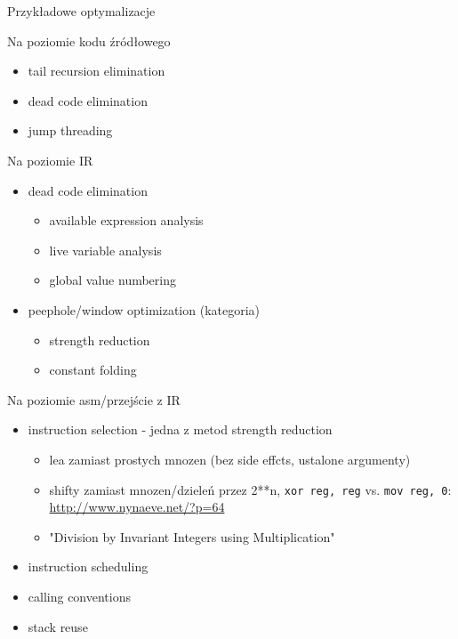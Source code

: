 \begin{frame}{Przykładowe optymalizacje}
\begin{block}{Na poziomie kodu źródłowego}
\begin{itemize}
			\item tail recursion elimination
			\item dead code elimination
			\item jump threading
		\end{itemize}
	\end{block}
	\begin{block}{Na poziomie IR}
		\begin{itemize}
			\item dead code elimination
				\begin{itemize}
					\item available expression analysis
					\item live variable analysis
					\item global value numbering
				\end{itemize}
			\item peephole/window optimization (kategoria)
				\begin{itemize}
					\item strength reduction
					\item constant folding
				\end{itemize}
		\end{itemize}
	\end{block}
	\begin{block}{Na poziomie asm/przejście z IR}
		\begin{itemize}
			\item instruction selection - jedna z metod strength reduction
				\begin{itemize}
					\item lea zamiast prostych mnozen (bez side effcts, ustalone argumenty)
					\item shifty zamiast mnozen/dzieleń przez 2**n, \texttt{xor reg, reg} vs. \texttt{mov reg, 0}: \url{http://www.nynaeve.net/?p=64}
					\item "Division by Invariant Integers using Multiplication"
				\end{itemize}
			\item instruction scheduling
			\item calling conventions
			\item stack reuse
		\end{itemize}
	\end{block}
\end{frame}
